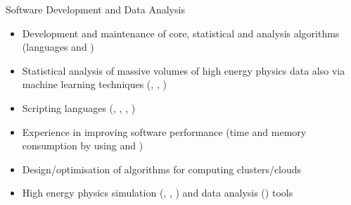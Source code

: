 \vspace{-2.5em}



\begin{cvskills}

\cvskill
{Software Development and Data Analysis}%
{
\begin{minipage}{0.49\textwidth}
\begin{itemize}[labelwidth=\the\widest,align=right,leftmargin=!,labelsep=1pt,noitemsep]
\item[\custItem] Development and maintenance of core, statistical and analysis
algorithms (languages \textsc{\color{awesome}{C++}} and
\textsc{\color{awesome}{Python}})
\item[\custItem] Statistical analysis of massive volumes of high energy physics
data also via machine learning techniques (\textsc{\color{awesome}{TMVA}},
\textsc{\color{awesome}{BDT}}, \textsc{\color{awesome}{TensorFlow}})
\item[\custItem] Scripting languages (\textsc{\color{awesome}{bash}},
\textsc{\color{awesome}{sh}}, \textsc{\color{awesome}{ksh}},
\textsc{\color{awesome}{csh}})
\end{itemize}
\end{minipage}
\hfill
\begin{minipage}{0.49\textwidth}
\begin{itemize}[labelwidth=\the\widest,align=right,leftmargin=!,labelsep=1pt,noitemsep]
\item[\custItem] Experience in improving software performance (time and memory
consumption by using \textsc{\color{awesome}{top/htop}} and
\textsc{\color{awesome}{Valgrind}})
\item[\custItem] Design/optimisation of algorithms for computing
clusters/clouds
\item[\custItem] High energy physics simulation
(\textsc{\color{awesome}{Powheg}}, \textsc{\color{awesome}{Pythia}},
\textsc{\color{awesome}{Madgraph}}) and data analysis
(\textsc{\color{awesome}{ROOT}}) tools
\end{itemize}
\end{minipage}
}


\end{cvskills}
